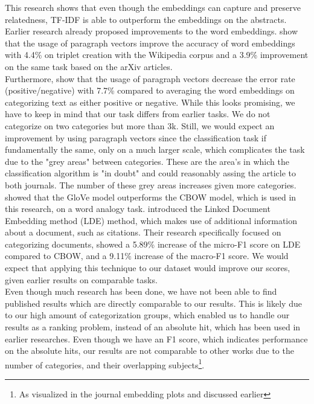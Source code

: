 \documentclass[../../Thesis.tex]{subfiles}
\begin{document}
This research shows that even though the embeddings can capture and preserve relatedness, TF-IDF is able to outperform the embeddings on the abstracts. Earlier research already proposed improvements to the word embeddings. \citet{dai2015document} show that the usage of paragraph vectors improve the accuracy of word embeddings with 4.4\% on triplet creation with the Wikipedia corpus and a 3.9\% improvement on the same task based on the arXiv articles.\\
Furthermore, \citet{le2014distributed} show that the usage of paragraph vectors decrease the error rate (positive/negative) with 7.7\% compared to averaging the word embeddings on categorizing text as either positive or negative. While this looks promising, we have to keep in mind that our task differs from earlier tasks. We do not categorize on two categories but more than 3k. Still, we would expect an improvement by using paragraph vectors since the classification task if fundamentally the same, only on a much larger scale, which complicates the task due to the "grey areas"  between categories. These are the area's in which the classification algorithm is "in doubt" and could reasonably assing the article to both journals. The number of these grey areas increases given more categories. \citet{pennington2014glove} showed that the GloVe model outperforms the CBOW model, which is used in this research, on a word analogy task. \citet{wang2016linked} introduced the Linked Document Embedding method (LDE) method, which makes use of additional information about a document, such as citations. Their research specifically focused on categorizing documents, showed a 5.89\% increase of the micro-F1 score on LDE compared to CBOW, and a 9.11\% increase of the macro-F1 score. We would expect that applying this technique to our dataset would improve our scores, given earlier results on comparable tasks.\\
Even though much research has been done, we have not been able to find published results which are directly comparable to our results. This is likely due to our high amount of categorization groups, which enabled us to handle our results as a ranking problem, instead of an absolute hit, which has been used in earlier researches\cite{wang2016linked}. Even though we have an F1 score, which indicates performance on the absolute hits, our results are not comparable to other works due to the number of categories, and their overlapping subjects\footnote{As visualized in the journal embedding plots and discussed earlier}.
\end{document}
